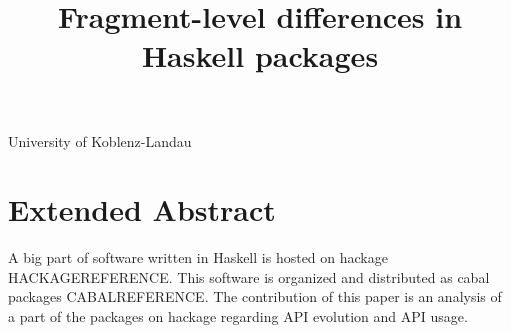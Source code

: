 \documentclass[preprint]{sigplanconf}
\begin{document}
\setlength{\pdfpageheight}{\paperheight}
\setlength{\pdfpagewidth}{\paperwidth}






\title{Fragment-level differences in Haskell packages}

           {University of Koblenz-Landau}
           {}

\maketitle





\section*{Extended Abstract}

A big part of software written in Haskell is hosted on hackage HACKAGEREFERENCE. This software is organized and distributed as cabal packages CABALREFERENCE. The contribution of this paper is an analysis of a part of the packages on hackage regarding API evolution and API usage.
\end{document}
